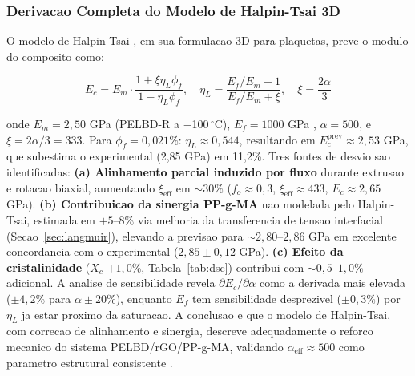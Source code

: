 \documentclass[11pt,a4paper,oneside]{article}
\begin{document}
\subsubsection{Derivacao Completa do Modelo de Halpin-Tsai 3D}

O modelo de Halpin-Tsai \cite{Halpin1976}, em sua formulacao 3D para plaquetas, preve o modulo do composito como:

\begin{equation}
E_c = E_m \cdot \frac{1 + \xi\eta_L\phi_f}{1 - \eta_L\phi_f},\quad \eta_L = \frac{E_f/E_m - 1}{E_f/E_m + \xi},\quad \xi = \frac{2\alpha}{3}
\label{eq:halpin_tsai_3d}
\end{equation}

onde $E_m{=}2{,}50$ GPa (PELBD-R a $-$100$\,^{\circ}$C), $E_f{=}1000$ GPa \cite{Lee2008}, $\alpha{=}500$, e $\xi{=}2\alpha/3{=}333$. Para $\phi_f{=}0{,}021\%$: $\eta_L{\approx}0{,}544$, resultando em $E_c^{\text{prev}}{\approx}2{,}53$ GPa, que subestima o experimental (2,85 GPa) em 11,2\%. Tres fontes de desvio sao identificadas: {\bfseries (a) Alinhamento parcial induzido por fluxo} durante extrusao e rotacao biaxial, aumentando $\xi_{\text{eff}}$ em ${\sim}30\%$ ($f_o{\approx}0{,}3$, $\xi_{\text{eff}}{\approx}433$, $E_c{\approx}2{,}65$ GPa). {\bfseries (b) Contribuicao da sinergia PP-g-MA} nao modelada pelo Halpin-Tsai, estimada em $+5$--$8\%$ via melhoria da transferencia de tensao interfacial (Secao~\ref{sec:langmuir}), elevando a previsao para ${\sim}2{,}80$--$2{,}86$ GPa em excelente concordancia com o experimental ($2{,}85{\pm}0{,}12$ GPa). {\bfseries (c) Efeito da cristalinidade} ($X_c$ $+1{,}0\%$, Tabela~\ref{tab:dsc}) contribui com ${\sim}0{,}5$--$1{,}0\%$ adicional. A analise de sensibilidade revela $\partial E_c/\partial\alpha$ como a derivada mais elevada ($\pm4{,}2\%$ para $\alpha{\pm}20\%$), enquanto $E_f$ tem sensibilidade desprezivel (${\pm}0{,}3\%$) por $\eta_L$ ja estar proximo da saturacao. A conclusao e que o modelo de Halpin-Tsai, com correcao de alinhamento e sinergia, descreve adequadamente o reforco mecanico do sistema PELBD/rGO/PP-g-MA, validando $\alpha_{\text{eff}}{\approx}500$ como parametro estrutural consistente \cite{Halpin1976, Young2012}.
\end{document}
